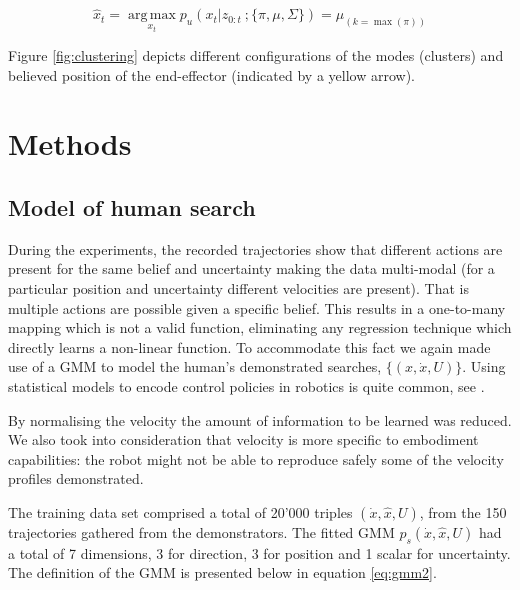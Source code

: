 \begin{equation}
 \hat{x}_t = \operatorname*{arg\,max}_{x_t} p_u(x_{t}|z_{0:t}\: ;\{\pi,\mu,\Sigma\}) = \mu_{(k = \max(\pi))}
\end{equation}

Figure \ref{fig:clustering} depicts different configurations of the modes (clusters) and believed position of the end-effector (indicated by a yellow arrow).  





\section{Methods}

\subsection{Model of human search}

During the experiments, the recorded trajectories show that different actions are present for the same belief and uncertainty making the data multi-modal
(for a particular position and uncertainty different velocities are present). That is multiple actions are possible given a specific belief. 
This results in a one-to-many mapping which is not a valid function, eliminating any regression technique which directly learns a non-linear function. 
To accommodate this fact we again made use of a GMM to model the human's demonstrated searches, $\{(x,\dot{x},U)\}$. 
Using statistical models to encode control policies in robotics is quite common, see \cite{BillardCDS08}. 

By normalising the velocity the amount of information to be learned was reduced. We also took into consideration that velocity is more 
specific to embodiment capabilities: the robot might not be able to reproduce safely some of the velocity profiles demonstrated. 

The training data set comprised a total of 20'000 triples $(\dot{x},\hat{x},U)$, from the 150 trajectories gathered from the demonstrators. 
The fitted GMM $p_s(\dot{x},\hat{x},U)$ had a total of 7 dimensions, 3 for direction, 3 for position and 1 scalar for uncertainty. 
The definition of the GMM is presented below in equation \ref{eq:gmm2}.

